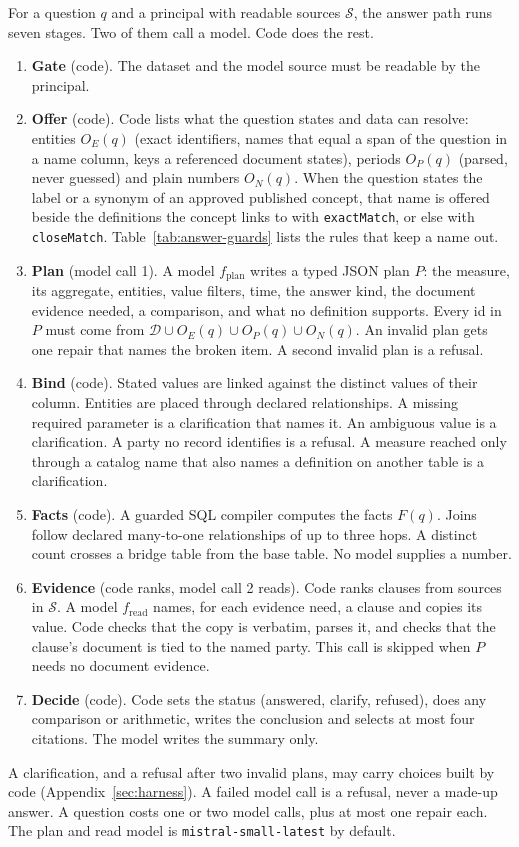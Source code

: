 \documentclass[11pt,a4paper]{article}
\begin{document}
For a question $q$ and a principal with readable sources $\mathcal{S}$, the answer path runs seven stages. Two of them call a model. Code does the rest. %
\begin{enumerate}[nosep]
\item \textbf{Gate} (code). The dataset and the model source must be readable by the principal.
\item \textbf{Offer} (code). Code lists what the question states and data can resolve: entities $O_E(q)$ (exact identifiers, names that equal a span of the question in a name column, keys a referenced document states), periods $O_P(q)$ (parsed, never guessed) and plain numbers $O_N(q)$. When the question states the label or a synonym of an approved published concept, that name is offered beside the definitions the concept links to with \texttt{exactMatch}, or else with \texttt{closeMatch}. Table~\ref{tab:answer-guards} lists the rules that keep a name out.
\item \textbf{Plan} (model call 1). A model $f_{\mathrm{plan}}$ writes a typed JSON plan $P$: the measure, its aggregate, entities, value filters, time, the answer kind, the document evidence needed, a comparison, and what no definition supports. Every id in $P$ must come from $\mathcal{D} \cup O_E(q) \cup O_P(q) \cup O_N(q)$. An invalid plan gets one repair that names the broken item. A second invalid plan is a refusal.
\item \textbf{Bind} (code). Stated values are linked against the distinct values of their column. Entities are placed through declared relationships. A missing required parameter is a clarification that names it. An ambiguous value is a clarification. A party no record identifies is a refusal. A measure reached only through a catalog name that also names a definition on another table is a clarification.
\item \textbf{Facts} (code). A guarded SQL compiler computes the facts $F(q)$. Joins follow declared many-to-one relationships of up to three hops. A distinct count crosses a bridge table from the base table. No model supplies a number.
\item \textbf{Evidence} (code ranks, model call 2 reads). Code ranks clauses from sources in $\mathcal{S}$. A model $f_{\mathrm{read}}$ names, for each evidence need, a clause and copies its value. Code checks that the copy is verbatim, parses it, and checks that the clause's document is tied to the named party. This call is skipped when $P$ needs no document evidence.
\item \textbf{Decide} (code). Code sets the status (answered, clarify, refused), does any comparison or arithmetic, writes the conclusion and selects at most four citations. The model writes the summary only.
\end{enumerate}
A clarification, and a refusal after two invalid plans, may carry choices built by code (Appendix~\ref{sec:harness}).
A failed model call is a refusal, never a made-up answer. A question costs one or two model calls, plus at most one repair each. The plan and read model is \texttt{mistral-small-latest} by default. %
\end{document}
